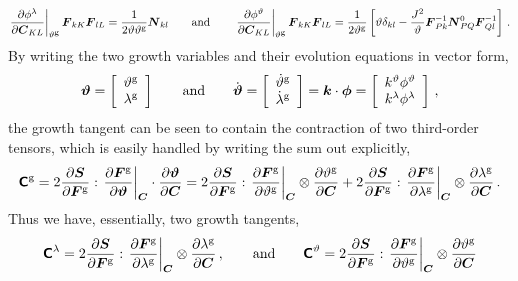 \documentclass[10pt,letterpaper,oneside]{report}
\newcommand{\ten}[1]{\mbox{\boldmath $#1$}{}}
\newcommand{\tenf}[1]{\mbox{{\sffamily{\bfseries {#1}}}}}
\newcommand{\scas}[1]{\mbox{{\scriptsize{${\rm{#1}}$}}}{}}
\newcommand{\tens}[1]{\mbox{\boldmath{\scriptsize{$#1$}}}{}}
\begin{document}
\begin{equation*}
\left. \frac{ \partial \phi^{\lambda} }{ \partial \ten{C}_{KL} } \right|_{\vartheta^{\scas{g}}} \ten{F}_{kK} \ten{F}_{lL} 
= \frac{1}{2 \vartheta \vartheta^{\scas{g}}} \ten{N}_{kl} 
\qquad \mbox{and} \qquad 
\left. \frac{ \partial \phi^{\vartheta} }{ \partial \ten{C}_{KL} } \right|_{\vartheta^{\scas{g}}} \ten{F}_{kK} \ten{F}_{lL} 
= \frac{1}{2 \vartheta^{\scas{g}}} \left[ \vartheta \delta_{kl} - \frac{J^2}{\vartheta} \ten{F}^{-1}_{Pk} \ten{N}^0_{PQ} \ten{F}^{-1}_{Ql} \right] \, .
\end{equation*}
By writing the two growth variables and their evolution equations in vector form, 
\begin{equation}
\ten{\vartheta} = \left[ \begin{array}{c} \vartheta^{\scas{g}} \\ \lambda^{\scas{g}} \end{array} \right] 
\qquad \mbox{and} \qquad
\dot{\ten{\vartheta} } = \left[ \begin{array}{c} \dot{\vartheta}^{\scas{g}} \\ \dot{\lambda}^{\scas{g}} \end{array} \right]  = \ten{k} \cdot \ten{\phi} = \left[ \begin{array}{c} k^{\vartheta} \phi^{\vartheta} \\ k^{\lambda} \phi^{\lambda} \end{array} \right] \, ,
\end{equation}
the growth tangent can be seen to contain the contraction of two third-order tensors, which is easily handled by writing the sum out explicitly, 
\begin{equation}
\tenf{C}^{\scas{g}} = 2 \frac{\partial \ten{S} }{\partial \ten{F}^{\scas{g}} } : \left. \frac{\partial \ten{F}^{\scas{g}} }{\partial \ten{\vartheta} } \right|_{\tens{C}} \cdot \frac{\partial \ten{\vartheta} }{\partial \ten{C}} = 2 \frac{\partial \ten{S} }{\partial \ten{F}^{\scas{g}} } : \left. \frac{\partial \ten{F}^{\scas{g}} }{\partial \vartheta^{\scas{g}} } \right|_{\tens{C}} \otimes \frac{\partial  \vartheta^{\scas{g}} }{\partial \ten{C}} + 2 \frac{\partial \ten{S} }{\partial \ten{F}^{\scas{g}} } : \left. \frac{\partial \ten{F}^{\scas{g}} }{\partial \lambda^{\scas{g}} } \right|_{\tens{C}} \otimes \frac{\partial \lambda^{\scas{g}} }{\partial \ten{C}} \, . 
\end{equation}
Thus we have, essentially, two growth tangents,
\begin{equation}
\tenf{C}^\lambda = 2 \frac{\partial \ten{S} }{\partial \ten{F}^{\scas{g}} } : \left. \frac{\partial \ten{F}^{\scas{g}} }{\partial \lambda^{\scas{g}} } \right|_{\tens{C}} \otimes \frac{\partial \lambda^{\scas{g}} }{\partial \ten{C}} \, , 
\qquad \mbox{and} \qquad 
\tenf{C}^\vartheta = 2 \frac{\partial \ten{S} }{\partial \ten{F}^{\scas{g}} } : \left. \frac{\partial \ten{F}^{\scas{g}} }{\partial \vartheta^{\scas{g}} } \right|_{\tens{C}} \otimes \frac{\partial  \vartheta^{\scas{g}} }{\partial \ten{C}}  
\end{equation}
\end{document}
